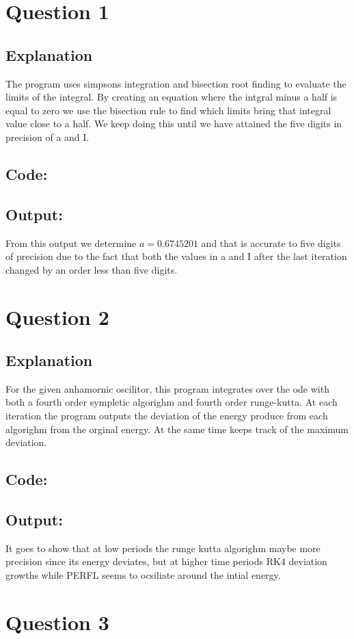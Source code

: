 \documentclass[10pt]{article}
\begin{document}
\section{Question 1}
\subsection{Explanation}
The program uses simpsons integration and bisection root finding to evaluate the limits of the integral. By creating an equation where the intgral minus a half is equal to zero we use the bisection rule to find which limits bring that integral value close to a half. We keep doing this until we have attained the five digits in precision of a and I.\subsection{Code:}

\subsection{Output:}

From this output we determine $a = 0.6745201$ and that is accurate to five digits of precision due to the fact that both the values in a and I after the last iteration changed by an order less than five digits.\section{Question 2}
\subsection{Explanation}
For the given anhamornic oscilitor, this program integrates over the ode with both a fourth order sympletic algorighm and fourth order runge-kutta. At each iteration the program outputs the deviation of the energy produce from each algorighm from the orginal energy. At the same time keeps track of  the maximum deviation.\subsection{Code:}

\subsection{Output:}

It goes to show that at low periods the runge kutta algorighm maybe more precision since its energy deviates, but at higher time periods RK4 deviation growths while PERFL seems to ocsiliate around the intial energy.\section{Question 3}
\end{document}
